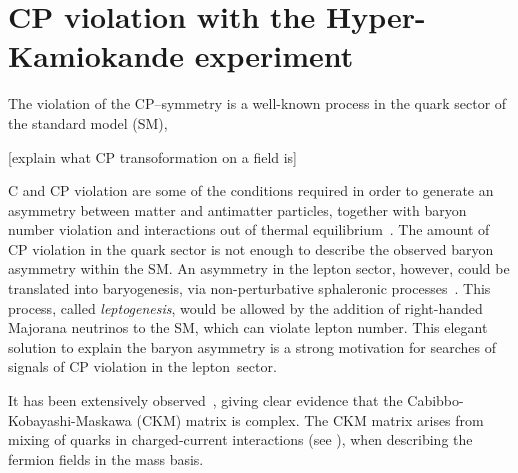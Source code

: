 \clearpage
\chapter{CP violation with the Hyper-Kamiokande experiment}
\label{sec:cp_hk}

The violation of the CP--symmetry is a well-known process in the quark sector of the standard model (SM),

[explain what CP transoformation on a field is]

C and CP violation are some of the conditions required in order to generate %
an asymmetry between matter and antimatter particles, together with %
baryon number violation and interactions out of thermal equilibrium~\cite{Sakharov:1967dj}.
The amount of CP violation in the quark sector is not enough %
to describe the observed baryon asymmetry within the SM.
An asymmetry in the lepton sector, however, could be translated into baryogenesis, %
via non-perturbative sphaleronic processes~\cite{Fukugita:1986hr}.
This process, called \emph{leptogenesis}, would be allowed by the addition of %
right-handed Majorana neutrinos to the SM, which can violate lepton number.
This elegant solution to explain the baryon asymmetry is a strong motivation %
for searches of signals of CP violation in the lepton~sector.


It has been extensively observed~\cite{Christenson:1964fg,Aubert:2001sp, Abe:2001xe, Aaij:2013iua, Aaij:2019kcg}, %
giving clear evidence that the Cabibbo-Kobayashi-Maskawa (CKM) matrix is complex.
The CKM matrix arises from mixing of quarks in charged-current interactions (see ), %
when describing the fermion fields in the mass basis.


